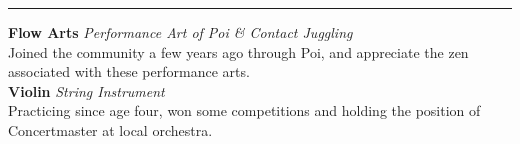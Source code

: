 \documentclass[14, .75in]{article}
\begin{document}
  \vspace{0.1cm} \hrule \vspace{0.3cm}
  \noindent\textbf{Flow Arts}\textit{ Performance Art of Poi \& Contact Juggling}\\
  Joined the community a few years ago through Poi, and appreciate the zen associated with these performance arts.\\
  \textbf{Violin}\textit{ String Instrument}\\
  Practicing since age four, won some competitions and holding the position of Concertmaster at local orchestra.
\end{document}
